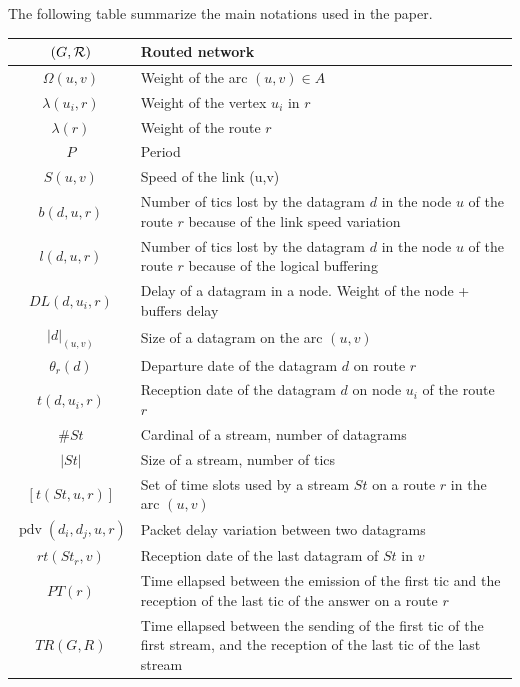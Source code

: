 \documentclass[10pt]{article}
\DeclareMathOperator{\pdv}{pdv}
\begin{document}
    The following table summarize the main notations used in the paper.
      \begin{center}
   \begin{tabularx}{0.8\textwidth}{|c|X|}
    \hline
     $(G,\cal R)$ & Routed network \\
     \hline
      $\Omega(u,v)$ & Weight of the arc $(u,v) \in A$ \\
      \hline
      $\lambda(u_i,r)$ & Weight of the vertex $u_i$ in $r$\\
    \hline
    $\lambda(r)$ & Weight of the route $r$\\
    \hline
    $P$ & Period\\
    \hline
    $S(u,v)$ & Speed of the link (u,v)\\
    \hline
    $b(d,u,r)$ & Number of tics lost by the datagram $d$ in the node $u$ of the route $r$ because of the link speed variation \\
    \hline
    $l(d,u,r)$ & Number of tics lost by the datagram $d$ in the node $u$ of the route $r$ because of the logical buffering \\
    \hline
    $DL(d,u_i,r)$ & Delay of a datagram in a node. Weight of the node + buffers delay\\
    \hline
    $|d|_{(u,v)}$ & Size of a datagram on the arc $(u,v)$ \\
    \hline
    $\theta_r(d)$ & Departure date of the datagram $d$ on route $r$ \\
    \hline
    $t(d,u_i,r)$ & Reception date of the datagram $d$ on node $u_i$ of the route $r$\\
    \hline
    $\#St$ & Cardinal of a stream, number of datagrams \\
    \hline
    $|St|$ & Size of a stream, number of tics \\       
    \hline
    $ [t(St,u,r)]$ & Set of time slots used by a stream $St$ on a route $r$ in the arc $(u,v)$ \\
    \hline
    $\pdv(d_i,d_j,u,r)$ & Packet delay variation between two datagrams \\
    \hline
    $rt(St_r,v)$ & Reception date of the last datagram of $St$ in $v$ \\
    \hline 
    $PT(r)$ & Time ellapsed between the emission of the first tic and the reception of the last tic of the answer on a route $r$ \\
    \hline
    $TR(G,R)$ &  Time ellapsed between the sending of the first tic of the first stream, and the reception of the last tic of the last stream \\
    \hline
      \end{tabularx}
      \end{center}
\end{document}
